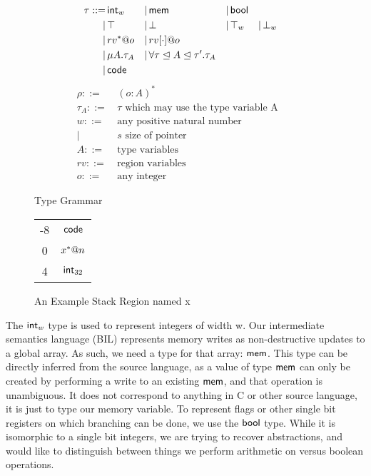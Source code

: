 \begin{figure}[t]
\begin{align*}
\tau ::=&\, \mathsf{int}_{w} &|&\, \mathsf{mem} &|&\, \mathsf{bool} \\
     |&\, \top &|&\, \bot &|&\, \top_{w} &|&\, \bot_{w}\\
     |&\, rv^*@o &|&\, rv[\cdot]@o\\
     |&\, \mu A. \tau_A &|&\, \forall \tau\mathrel{\unlhd} A\mathrel{\unlhd} \tau'.\tau_A\\
     |&\, \mathsf{code}
\end{align*}
\vspace{-2.0\baselineskip}
\begin{align*}
\rho ::=&\, (o : A)^* && \\
\tau_A ::=&\, \tau \textrm{ which may use the type variable A}\\
w ::=&\, \textrm{any positive natural number}\\
    |&\, s \textrm{ size of pointer}\\
A ::=&\, \textrm{type variables}\\
rv ::=&\, \textrm{region variables}\\
o ::=&\, \textrm{any integer}
\end{align*}
\caption{Type Grammar}
\label{fig:tform}
\end{figure}
\begin{figure}
\begin{center}
\begin{tabular}{|c|c|}
\hline
-8 & $\mathsf{code}$\\
0 & $x^*@n$\\
4 & $\mathsf{int}_{32}$\\
\hline
\end{tabular}
\end{center}
\caption{An Example Stack Region named x}
\label{fig:region}
\end{figure}

The $\mathsf{int}_{w}$ type is used to represent integers of width w.
Our intermediate semantics language (BIL) represents memory writes as non-destructive updates to a global array. As such, we need a type for that array: $\mathsf{mem}$. This type can be directly inferred from the source language, as a value of type $\mathsf{mem}$ can only be created by performing a write to an existing $\mathsf{mem}$, and that operation is unambiguous. It does not correspond to anything in C or other source language, it is just to type our memory variable.
To represent flags or other single bit registers on which branching can be done, we use the $\mathsf{bool}$ type. While it is isomorphic to a single bit integers, we are trying to recover abstractions, and would like to distinguish between things we perform arithmetic on versus boolean operations.

